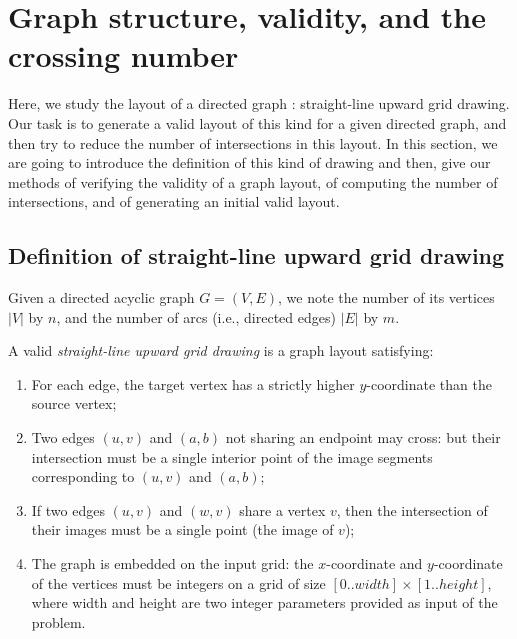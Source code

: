 
\newpage
\textit{}
\section{Graph structure, validity, and the crossing number}
Here, we study the layout of a directed graph : straight-line upward grid drawing. Our task is to generate a valid layout of this kind for a given directed graph, and then try to reduce the number of intersections in this layout. 
In this section, we are going to introduce the definition of this kind of drawing and then, give our methods of verifying the validity of a graph layout, of computing the number of intersections, and of generating an initial valid layout.  




\subsection{Definition of straight-line upward grid drawing}
Given a directed acyclic graph $G = (V, E)$, we note the number of its vertices $|V|$ by $n$, and the number of arcs (i.e., directed edges) $|E|$ by $m$.

A valid \textit{straight-line upward grid drawing}\cite{contest2020} is a graph layout satisfying:
\begin{enumerate}
    \item For each edge, the target vertex has a strictly higher $y$-coordinate than the source vertex;

    \item Two edges $(u, v)$ and $(a, b)$ not sharing an endpoint may cross: but their intersection must be a single interior point of the image segments corresponding to $(u, v)$ and $(a, b)$; 

    \item If two edges $(u, v)$ and $(w, v)$ share a vertex $v$, then the intersection of their images must be a single point (the image of $v$);

    \item The graph is embedded on the input grid: the $x$-coordinate and $y$-coordinate of the vertices must be integers on a grid of size $[0..width] \times [1..height]$, where width and height are two integer parameters provided as input of the problem.
\end{enumerate}




